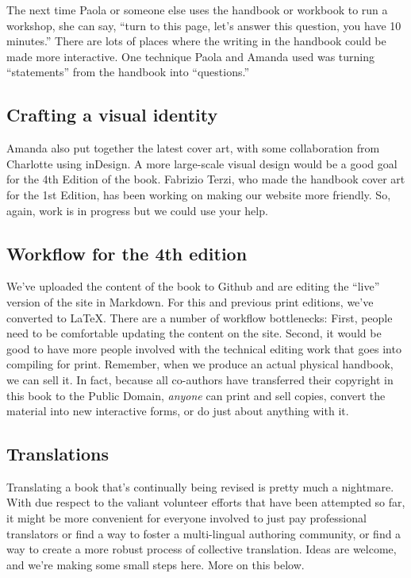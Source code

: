 The next time Paola or someone else uses the handbook or workbook to run
a workshop, she can say, ``turn to this page, let's answer this
question, you have 10 minutes.'' There are lots of places where the
writing in the handbook could be made more interactive. One technique
Paola and Amanda used was turning ``statements'' from the handbook into
``questions.''

\hypertarget{crafting-a-visual-identity}{%
\subsection{Crafting a visual
identity}\label{crafting-a-visual-identity}}

Amanda also put together the latest cover art, with some collaboration
from Charlotte using inDesign. A more large-scale visual design would be
a good goal for the 4th Edition of the book. Fabrizio Terzi, who made
the handbook cover art for the 1st Edition, has been working on making
our website more friendly. So, again, work is in progress but we could
use your help.

\hypertarget{workflow-for-the-4th-edition}{%
\subsection{Workflow for the 4th
edition}\label{workflow-for-the-4th-edition}}

We've uploaded the content of the book to Github and are editing the
``live'' version of the site in Markdown. For this and previous print
editions, we've converted to LaTeX. There are a number of workflow
bottlenecks: First, people need to be comfortable updating the content
on the site. Second, it would be good to have more people involved with
the technical editing work that goes into compiling for print. Remember,
when we produce an actual physical handbook, we can sell it. In fact,
because all co-authors have transferred their copyright in this book to
the Public Domain, \emph{anyone} can print and sell copies, convert the
material into new interactive forms, or do just about anything with it.

\hypertarget{translations}{%
\subsection{Translations}\label{translations}}

Translating a book that's continually being revised is pretty much a
nightmare. With due respect to the valiant volunteer efforts that have
been attempted so far, it might be more convenient for everyone involved
to just pay professional translators or find a way to foster a
multi-lingual authoring community, or find a way to create a more robust
process of collective translation. Ideas are welcome, and we're making
some small steps here. More on this below.

